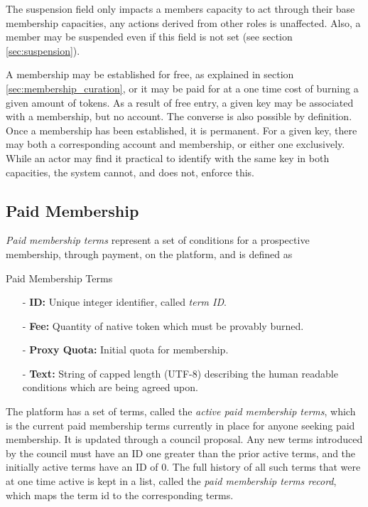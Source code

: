 \documentclass{article}
\newenvironment{concept_box}[1]
    {
    \begin{tcolorbox}
    {\large \textbf{#1} }
    }
    {
    \end{tcolorbox}
    }
\begin{document}
The suspension field only impacts a members capacity to act through their base membership capacities, any actions derived from other roles is unaffected. Also, a member may be suspended even if this field is not set (see section \ref{sec:suspension}).

A membership may be established for free, as explained in section \ref{sec:membership_curation}, or it may be paid for at a one time cost of burning a given amount of tokens. As a result of free entry, a given key may be associated with a membership, but no account. The converse is also possible by definition. Once a membership has been established, it is permanent. For a given key, there may both a corresponding account and membership, or either one exclusively. While an actor may find it practical to identify with the same key in both capacities, the system cannot, and does not, enforce this.


\subsection{Paid Membership} \label{sec:paid_membership}

\textit{Paid membership terms} represent a set of conditions for a prospective membership, through payment, on the platform, and is defined as\\

\begin{concept_box}{Paid Membership Terms}
    \begin{itemize}
      \item[-] \textbf{ID:} Unique integer identifier, called \textit{term ID}.
      \item[-] \textbf{Fee:} Quantity of native token which must be provably burned.
      \item[-] \textbf{Proxy Quota:} Initial quota for membership.
      \item[-] \textbf{Text:} String of capped length (UTF-8) describing the human readable conditions which are being agreed upon.
    \end{itemize}
\end{concept_box}

The platform has a set of terms, called the \textit{active paid membership terms}, which is the current paid membership terms currently in place for anyone seeking paid membership. It is updated through a council proposal. Any new terms introduced by the council must have an ID one greater than the prior active terms, and the initially active terms have an ID of $0$. The full history of all such terms that were at one time active is kept in a list, called the \textit{paid membership terms record}, which maps the term id to the corresponding terms.
\end{document}
